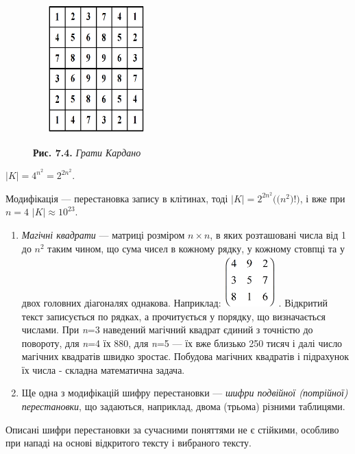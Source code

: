 \begin{figure}
\centering
\begin{minipage}{}
 \includegraphics[width=1.9374in,height=1.9374in]{crypt-img/crypt-img75.png} 
\end{minipage}
\end{figure}
\begin{figure}
\centering
\begin{minipage}{2.3575in}
{\centering
\textbf{Рис. 7.4. }\textit{Грати Кардано}
\par}
\end{minipage}
\end{figure}
{\centering
 ${|K|=4^{{n^{{2}}}}=2^{2n^{{2}}}}$.
\par}

Модифікація --- перестановка запису в клітинах, тоді  
${|K|=2^{{2n^{{2}}}}((n^{2}{)!)}}$,  і вже при  ${n=4}$   ${|K|\approx
\text{10}^{{\text{23}}}}$.

\liststyleWWviiiNumxli
\setcounter{saveenum}{\value{enumi}}
\begin{enumerate}
\setcounter{enumi}{\value{saveenum}}
\item \textit{Магічні квадрати} --- матриці розміром  ${n\times n}$, в яких
розташовані числа від 1 до  ${n^{{2}}}$ таким чином, що сума чисел в кожному
рядку, у кожному стовпці та у двох головних діагоналях однакова. Наприклад: 
\includegraphics[width=0.778in,height=0.778in]{crypt-img/crypt-img76.png} .
Відкритий текст записується по рядках, а прочитується у порядку, що
визначається числами. При \textit{n}=3 наведений магічний квадрат єдиний з
точністю до повороту, для \textit{n}=4  їх  880, для \textit{n}=5 --- їх вже
близько 250 тисяч і далі число магічних квадратів швидко зростає. Побудова
магічних квадратів і підрахунок їх числа - складна математична задача. 
\item Ще одна з модифікацій шифру перестановки --- \textit{шифри подвійної
(потрійної) перестановки}, що задаються, наприклад,  двома (трьома) різними
таблицями.
\end{enumerate}
 Описані шифри перестановки за сучасними поняттями  не є стійкими, особливо при
нападі на основі відкритого тексту і вибраного тексту.


